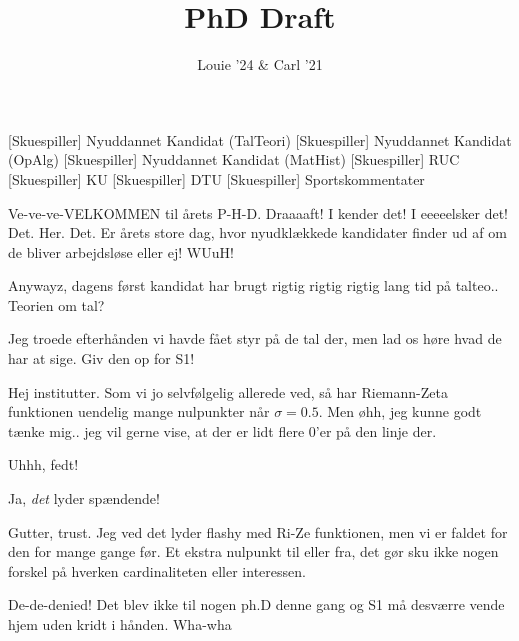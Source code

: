 \documentclass[a4paper,11pt]{article}
\title{PhD Draft}
\author{Louie '24 \& Carl '21}
\begin{document}
\maketitle

\begin{roles}
[Skuespiller] Nyuddannet Kandidat (TalTeori)
[Skuespiller] Nyuddannet Kandidat (OpAlg)
[Skuespiller] Nyuddannet Kandidat (MatHist)
[Skuespiller] RUC
[Skuespiller] KU
[Skuespiller] DTU
[Skuespiller] Sportskommentater
\end{roles}


\begin{sketch}


 Ve-ve-ve-VELKOMMEN til årets P-H-D. Draaaaft! I kender det! I eeeeelsker det! Det. Her. Det. Er årets store dag, hvor nyudklækkede kandidater finder ud af om de bliver arbejdsløse eller ej! WUuH!


 Anywayz, dagens først kandidat har brugt rigtig rigtig rigtig lang tid på talteo.. Teorien om tal?

 Jeg troede efterhånden vi havde fået styr på de tal der, men lad os høre hvad de har at sige. Giv den op for S1!


 Hej institutter. Som vi jo selvfølgelig allerede ved, så har Riemann-Zeta funktionen uendelig mange nulpunkter når $\sigma = 0.5$. Men øhh, jeg kunne godt tænke mig.. jeg vil gerne vise, at der er lidt flere 0'er på den linje der. 


 Uhhh, fedt!

 Ja, \textit{det} lyder spændende!

 Gutter, trust. Jeg ved det lyder flashy med Ri-Ze funktionen, men vi er faldet for den for mange gange før. Et ekstra nulpunkt til eller fra, det gør sku ikke nogen forskel på hverken cardinaliteten eller interessen. 


 De-de-denied! Det blev ikke til nogen ph.D denne gang og S1 må desværre vende hjem uden kridt i hånden. Wha-wha


\end{sketch}
\end{document}
